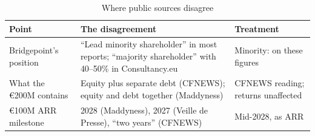 \begin{table}[H]
\caption{Where public sources disagree}
\vspace{-2pt}
\tbl
\begin{tabularx}{\textwidth}{@{}P{3.5cm}LP{5.1cm}@{}}
\toprule
Point & The disagreement & Treatment \\
\midrule
Bridgepoint's position & ``Lead minority shareholder'' in most reports; ``majority shareholder'' with 40--50\% in Consultancy.eu & Minority:  on these figures \\
What the €200M contains & Equity plus separate debt (CFNEWS); equity and debt together (Maddyness) & CFNEWS reading; returns unaffected \\
€100M ARR milestone & 2028 (Maddyness), 2027 (Veille de Presse), ``two years'' (CFNEWS) & Mid-2028, as ARR \\
\bottomrule
\end{tabularx}
\end{table}
\vspace{-5pt}


